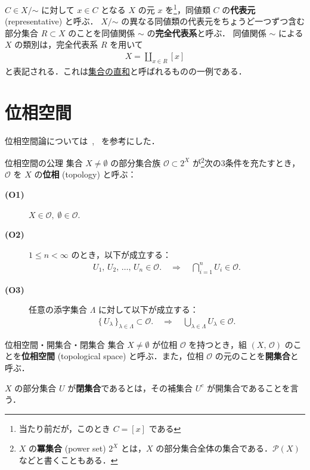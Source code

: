 \documentclass[geometry_main]{subfiles}
\begin{document}
$C \in X/\mathord{\sim}$ に対して $x \in C$ となる $X$ の元 $x$ を\footnote{当たり前だが，このとき $C = [x]$ である}，同値類 $C$ の\textbf{代表元} (representative) と呼ぶ．
$X/\mathord{\sim}$ の異なる同値類の代表元をちょうど一つずつ含む部分集合 $R \subset X$ のことを同値関係 ${\sim}$ の\textbf{完全代表系}と呼ぶ．
同値関係 ${\sim}$ による $X$ の類別は，完全代表系 $R$ を用いて
\begin{align}
	X = \coprod_{x \in R} [x]
\end{align}
と表記される．これは\hyperref[def.disjoint-union]{集合の直和}と呼ばれるものの一例である．

\newpage

\section{位相空間}

位相空間論については~\cite[第2章]{Nomura}, ~\cite{Matuzaka}を参考にした．

\begin{myaxiom}[label=ax.topo]{位相空間の公理}
	集合 $X \neq \emptyset$ の部分集合族 $\mathscr{O} \subset 2^{X}$ が\footnote{$X$ の\textbf{冪集合} (power set) $2^X$ とは，$X$ の部分集合全体の集合である．$\mathscr{P}(X)$ などと書くこともある．}次の3条件を充たすとき，$\mathscr{O}$ を $X$ の\textbf{位相} (topology) と呼ぶ：
	\begin{description}
		\item[\textbf{(O1)}] $ X \in \mathscr{O},\; \emptyset \in \mathscr{O}$.
		\item[\textbf{(O2)}] $1 \le n < \infty$ のとき，以下が成立する：
			\begin{align}
				U_1,\, U_2,\, \dots ,\, U_n \in \mathscr{O}. \quad \Longrightarrow \quad \bigcap_{i=1}^n U_i \in \mathscr{O}.
			\end{align}
		\item[\textbf{(O3)}] 任意の添字集合 $ \Lambda $ に対して以下が成立する：
			\begin{align}
				\bigl\{\, U_{\lambda} \, \bigr\}_{\lambda \in \Lambda} \subset \mathscr{O}. \quad \Longrightarrow \quad \bigcup_{ \lambda \in \Lambda } U_{ \lambda } \in \mathscr{O}.
			\end{align}
	\end{description}
\end{myaxiom}

\begin{mydef}{位相空間・開集合・閉集合}
	集合 $X \neq \emptyset$ が位相 $\mathscr{O}$ を持つとき，組 $(X,\, \mathscr{O})$ のことを\textbf{位相空間} (topological space) と呼ぶ．また，位相 $\mathscr{O}$ の元のことを\textbf{開集合}と呼ぶ．

	$X$ の部分集合 $U$ が\textbf{閉集合}であるとは，その補集合 $U^c$ が開集合であることを言う．
\end{mydef}
\end{document}
